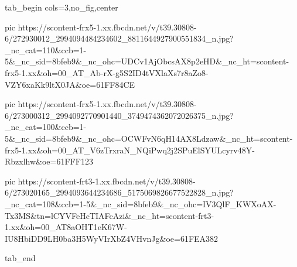  
 
 
 
 


\ifcmt
  tab_begin cols=3,no_fig,center

     pic https://scontent-frx5-1.xx.fbcdn.net/v/t39.30808-6/272930012_2994094484234602_8811644927900551834_n.jpg?_nc_cat=110&ccb=1-5&_nc_sid=8bfeb9&_nc_ohc=UDCv1AjObcsAX8p2eHD&_nc_ht=scontent-frx5-1.xx&oh=00_AT_Ab-rX-g5S2ID4tVXlaXs7r8aZo8-VZY6xaKk9ltX0JA&oe=61FF84CE

     pic https://scontent-frx5-1.xx.fbcdn.net/v/t39.30808-6/273000312_2994092770901440_3749474362072026375_n.jpg?_nc_cat=100&ccb=1-5&_nc_sid=8bfeb9&_nc_ohc=OCWFvN6qH14AX8Ldzaw&_nc_ht=scontent-frx5-1.xx&oh=00_AT_V6zTrxraN_NQiPwq2j2SPuElSYULcyrv48Y-Rbzxlhw&oe=61FFF123

     pic https://scontent-frt3-1.xx.fbcdn.net/v/t39.30808-6/273020165_2994093644234686_5175069826677522828_n.jpg?_nc_cat=108&ccb=1-5&_nc_sid=8bfeb9&_nc_ohc=IV3QlF_KWXoAX-Tx3MS&tn=lCYVFeHcTIAFcAzi&_nc_ht=scontent-frt3-1.xx&oh=00_AT8aOHT1eK67W-IU8HbiDD9LH0ba3H5WyVIrXbZ4VHvnJg&oe=61FEA382

  tab_end
\fi
